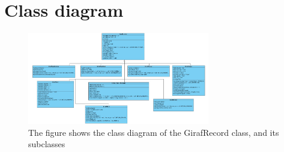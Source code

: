 \chapter{Class diagram}
\label{diagramAppendix}

\begin{figure}[ht]
\centering
\includegraphics[angle=90,width=300px]{img/classdiagram_Fixed.jpg}
\caption{The figure shows the class diagram of the GirafRecord class, and its subclasses}
\label{fig:diagram}
\end{figure}